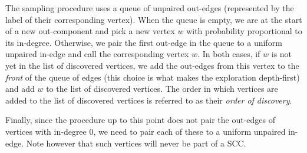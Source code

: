 
The sampling procedure uses a queue of unpaired out-edges (represented by the label of their corresponding vertex). When the queue is empty, we are at the start of a new out-component and pick a new vertex $w$ with probability proportional to its in-degree. Otherwise, we pair the first out-edge in the queue to a uniform unpaired in-edge and call the corresponding vertex $w$. In both cases, if $w$ is not yet in the list of discovered vertices, we add the out-edges from this vertex to the \emph{front} of the queue of edges (this choice is what makes the exploration depth-first) and add $w$ to the list of discovered vertices. The order in which vertices are added to the list of discovered vertices is referred to as their \emph{order of discovery}. 

Finally, since the procedure up to this point does not pair the out-edges of vertices with in-degree 0, we need to pair each of these to a uniform unpaired in-edge. Note however that such vertices will never be part of a SCC.

